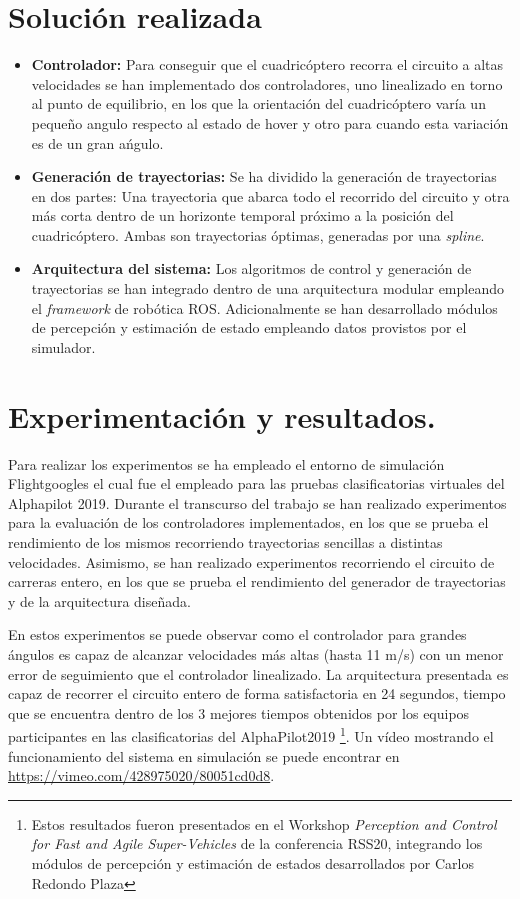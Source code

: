 \section*{Solución realizada}
\begin{itemize}
\item \textbf{Controlador:}
Para conseguir que el cuadricóptero recorra el circuito a altas velocidades se han implementado dos controladores, uno linealizado en torno al punto de equilibrio, en los que la orientación del cuadricóptero varía un pequeño angulo respecto al estado de hover y otro para cuando esta variación es de un gran ańgulo.

\item \textbf{Generación de trayectorias:} Se ha dividido la generación de trayectorias en dos partes:
Una trayectoria que abarca todo el recorrido del circuito y otra más corta dentro de un horizonte temporal próximo a la posición del cuadricóptero. Ambas son trayectorias óptimas, generadas por una \textit{spline}.

\item \textbf{Arquitectura del sistema:} Los algoritmos de control y generación de trayectorias se han integrado dentro de una arquitectura modular empleando el \textit{framework} de robótica ROS. Adicionalmente se han desarrollado módulos de percepción y estimación de estado empleando datos provistos por el simulador.

\end{itemize}
	

\section*{Experimentación y resultados.}

Para realizar los experimentos se ha empleado el entorno de simulación Flightgoogles \cite{guerra2019flightgoggles}  el cual fue el empleado para las pruebas clasificatorias virtuales del Alphapilot 2019. Durante el transcurso del trabajo se han realizado experimentos para la evaluación de los controladores implementados, en los que se prueba el rendimiento de los mismos recorriendo trayectorias sencillas a distintas velocidades. Asimismo, se han realizado experimentos recorriendo el circuito de carreras entero, en los que se prueba el rendimiento del generador de trayectorias y de la arquitectura diseñada.

En estos experimentos se puede observar como el controlador para grandes ángulos es capaz de alcanzar velocidades más altas (hasta 11 m/s) con un menor error de seguimiento que el controlador linealizado. La arquitectura presentada es capaz de recorrer el circuito entero de forma satisfactoria en 24 segundos, tiempo que se encuentra dentro de los 3 mejores tiempos obtenidos por los equipos participantes en las clasificatorias del AlphaPilot2019 \cite{guerra2019flightgoggles} \footnote{Estos resultados fueron presentados en el Workshop  \textit{Perception and Control for Fast and Agile Super-Vehicles} de la conferencia RSS20, integrando los módulos de percepción y estimación de estados desarrollados por Carlos Redondo Plaza}. Un vídeo mostrando el funcionamiento del sistema en simulación se puede encontrar en \url{https://vimeo.com/428975020/80051cd0d8}.


